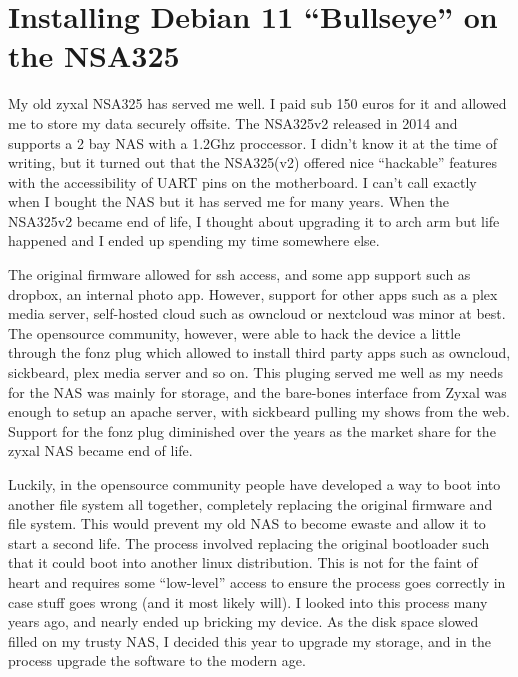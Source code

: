\documentclass[11pt]{article}
\author{Casper van Elteren}
\date{\today}
\title{}
\begin{document}
\tableofcontents

\section{Installing Debian 11 ``Bullseye'' on the NSA325}
\label{sec:org4127854}
My old zyxal NSA325 has served me well. I paid sub 150 euros
for it and allowed me to store my data securely offsite. The
NSA325v2 released  in 2014 and supports  a 2 bay NAS  with a
1.2Ghz proccessor. I didn't know  it at the time of writing,
but  it   turned  out  that  the   NSA325(v2)  offered  nice
``hackable'' features  with the accessibility of  UART pins on
the motherboard. I can't call  exactly when I bought the NAS
but  it has  served me  for  many years.  When the  NSA325v2
became end of life, I thought about upgrading it to arch arm
but life happened and I  ended up spending my time somewhere
else.

The original firmware  allowed for ssh access,  and some app
support  such as  dropbox, an  internal photo  app. However,
support  for  other  apps  such  as  a  plex  media  server,
self-hosted cloud such as owncloud or nextcloud was minor at
best. The  opensource community, however, were  able to hack
the device a  little through the fonz plug  which allowed to
install third  party apps such as  owncloud, sickbeard, plex
media server  and so on. This  pluging served me well  as my
needs for the NAS was mainly for storage, and the bare-bones
interface from Zyxal  was enough to setup  an apache server,
with sickbeard  pulling my shows  from the web.  Support for
the fonz plug diminished over  the years as the market share
for the zyxal NAS became end of life.

Luckily, in the opensource community people have developed a
way  to   boot  into  another  file   system  all  together,
completely replacing the original  firmware and file system.
This would prevent my old NAS  to become ewaste and allow it
to start a  second life. The process  involved replacing the
original  bootloader such  that it  could boot  into another
linux distribution. This  is not for the faint  of heart and
requires some ``low-level'' access  to ensure the process goes
correctly  in case  stuff  goes wrong  (and  it most  likely
will). I looked into this process many years ago, and nearly
ended up bricking my device. As the disk space slowed filled
on my trusty NAS, I decided this year to upgrade my storage,
and in the process upgrade the software to the modern age.
\end{document}
